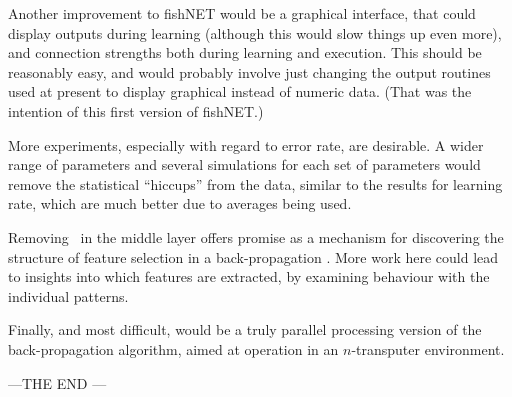 Another improvement to fishNET would be a graphical interface, that
could display outputs during learning (although this would slow
things up even more), and connection strengths both during learning
and execution.
This should be reasonably easy, and would probably involve just
changing the output routines used at present to display graphical
instead of numeric data.
(That was the intention of this first version of fishNET.)

More experiments, especially with regard to error rate, are
desirable.
A wider range of parameters and several simulations for each
set of parameters would remove the statistical ``hiccups'' from the
data, similar to the results for learning rate, which are much
better due to averages being used.

Removing \neus\ in the middle layer offers promise as a mechanism
for discovering the structure of feature selection in a
back-propagation \nn.
More work here could lead to insights into which features are extracted,
by examining behaviour with the individual patterns.

Finally, and most difficult, would be a truly parallel processing
version of the back-propagation algorithm, aimed at operation in
an $n$-transputer environment.

\centerline{---{\eightrm THE END} ---}

